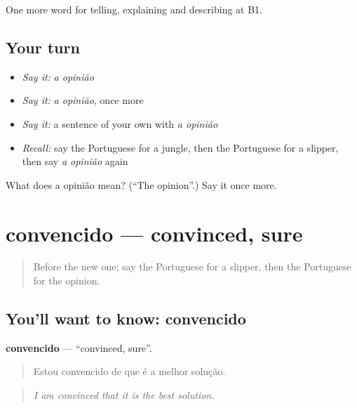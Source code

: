 \begin{grammarlens}[title={What you've built}]
One more word for telling, explaining and describing at B1.
\end{grammarlens}

\subsection*{Your turn}
\begin{itemize}
\raggedright
  \item \emph{Say it:} \emph{a opinião}
  \item \emph{Say it:} \emph{a opinião}, once more
  \item \emph{Say it:} a sentence of your own with \emph{a opinião}
  \item \emph{Recall:} say the Portuguese for a jungle, then the Portuguese for a slipper, then say \emph{a opinião} again
\end{itemize}

\begin{tcolorbox}[breakable,colback=teal!4,colframe=teal!35!black,title={Before you move on}]
What does a opinião mean? (\textquotedblleft{}The opinion\textquotedblright{}.) Say it once more.
\end{tcolorbox}
\section[convencido]{convencido — convinced, sure}

\label{lesson:PT-C335-convencido}



\begin{quote}
Before the new one: say the Portuguese for a slipper, then the Portuguese for the opinion.
\end{quote}

\subsection*{You'll want to know: convencido}
\textbf{convencido} — \textquotedblleft{}convinced, sure\textquotedblright{}.

\begin{quote}
Estou convencido de que é a melhor solução.
\end{quote}

\begin{quote}
\emph{I am convinced that it is the best solution.}
\end{quote}


